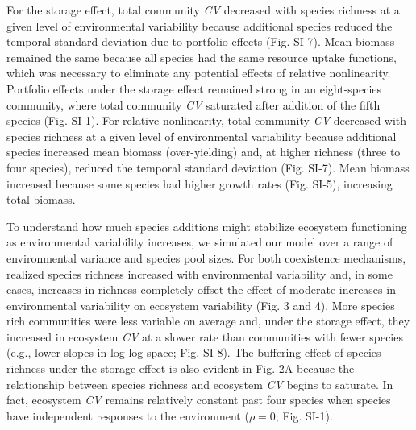 \documentclass[12pt,]{article}
\begin{document}
For the storage effect, total community \emph{CV} decreased with species
richness at a given level of environmental variability because
additional species reduced the temporal standard deviation due to
portfolio effects (Fig. SI-7). Mean biomass remained the same because
all species had the same resource uptake functions, which was necessary
to eliminate any potential effects of relative nonlinearity. Portfolio
effects under the storage effect remained strong in an eight-species
community, where total community \emph{CV} saturated after addition of
the fifth species (Fig. SI-1). For relative nonlinearity, total
community \emph{CV} decreased with species richness at a given level of
environmental variability because additional species increased mean
biomass (over-yielding) and, at higher richness (three to four species),
reduced the temporal standard deviation (Fig. SI-7). Mean biomass
increased because some species had higher growth rates (Fig. SI-5),
increasing total biomass.

To understand how much species additions might stabilize ecosystem
functioning as environmental variability increases, we simulated our
model over a range of environmental variance and species pool sizes. For
both coexistence mechanisms, realized species richness increased with
environmental variability and, in some cases, increases in richness
completely offset the effect of moderate increases in environmental
variability on ecosystem variability (Fig. 3 and 4). More species rich
communities were less variable on average and, under the storage effect,
they increased in ecosystem \emph{CV} at a slower rate than communities
with fewer species (e.g., lower slopes in log-log space; Fig. SI-8). The
buffering effect of species richness under the storage effect is also
evident in Fig. 2A because the relationship between species richness and
ecosystem \emph{CV} begins to saturate. In fact, ecosystem \emph{CV}
remains relatively constant past four species when species have
independent responses to the environment (\(\rho=0\); Fig. SI-1).
\end{document}
